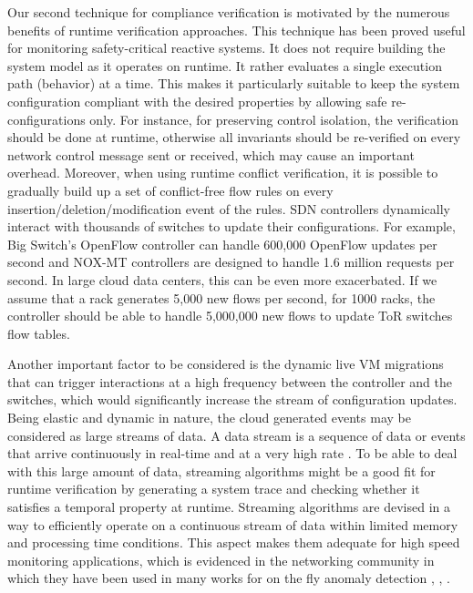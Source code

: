 \documentclass[12pt]{article}
\begin{document}
Our second technique for compliance verification is motivated by the
numerous benefits of runtime verification approaches. This technique
has been proved useful for monitoring safety-critical reactive
systems. It does not require building the system model as it operates
on runtime. It rather evaluates a single execution path (behavior) at
a time. This makes it particularly suitable to keep the system
configuration compliant with the desired properties by allowing safe
re-configurations only. For instance, for preserving control
isolation, the verification should be done at runtime, otherwise all
invariants should be re-verified on every network control message sent
or received, which may cause an important overhead.  Moreover, when
using runtime conflict verification, it is possible to gradually build
up a set of conflict-free flow rules on every
insertion/deletion/modification event of the rules.  SDN controllers
dynamically interact with thousands of switches to update their
configurations. For example, Big Switch's OpenFlow controller can
handle 600,000 OpenFlow updates per second and NOX-MT controllers are
designed to handle 1.6 million requests per second. In large cloud
data centers, this can be even more exacerbated. If we assume that a
rack generates 5,000 new flows per second, for 1000 racks, the
controller should be able to handle 5,000,000 new flows to update ToR
switches flow tables. 

Another important factor to be considered is the dynamic live VM
migrations that can trigger interactions at a high frequency between
the controller and the switches, which would significantly increase
the stream of configuration updates.  Being elastic and dynamic in
nature, the cloud generated events may be considered as large streams
of data. A data stream is a sequence of data or events that arrive
continuously in real-time and at a very high rate
\cite{streamingAlgo}. To be able to deal with this large amount of
data, streaming algorithms \cite{streamingAlgo} might be a good fit
for runtime verification by generating a system trace and checking
whether it satisfies a temporal property at runtime.  Streaming
algorithms are devised in a way to efficiently operate on a continuous
stream of data within limited memory and processing time
conditions. This aspect makes them adequate for high speed monitoring
applications, which is evidenced in the networking community in which
they have been used in many works for on the fly anomaly detection
\cite{Liu:2009:DDS:1639562.1639596},
\cite{Lall:2006:DSA:1140103.1140295}, \cite{4268161}.
\end{document}
